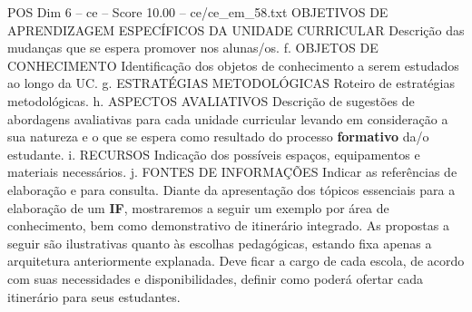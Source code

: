 \begin{textsample}{POS Dim 6 – ce – Score 10.00 – ce/ce\_em\_58.txt}
OBJETIVOS DE APRENDIZAGEM ESPECÍFICOS DA UNIDADE CURRICULAR Descrição das mudanças que se espera promover nos alunas/os. f.
OBJETOS DE CONHECIMENTO Identificação dos objetos de conhecimento a serem estudados ao longo da UC. g.
ESTRATÉGIAS METODOLÓGICAS Roteiro de estratégias metodológicas. h.
ASPECTOS AVALIATIVOS Descrição de sugestões de abordagens avaliativas para cada unidade curricular levando em consideração a sua natureza e o que se espera como resultado do processo \textbf{formativo} da/o estudante. i.
RECURSOS Indicação dos possíveis espaços, equipamentos e materiais necessários. j.
FONTES DE INFORMAÇÕES Indicar as referências de elaboração e para consulta.
Diante da apresentação dos tópicos essenciais para a elaboração de um \textbf{IF}, mostraremos a seguir um exemplo por área de conhecimento, bem como demonstrativo de itinerário integrado.
As propostas a seguir são ilustrativas quanto às escolhas pedagógicas, estando fixa apenas a arquitetura anteriormente explanada.
Deve ficar a cargo de cada escola, de acordo com suas necessidades e disponibilidades, definir como poderá ofertar cada itinerário para seus estudantes.

\end{textsample}
